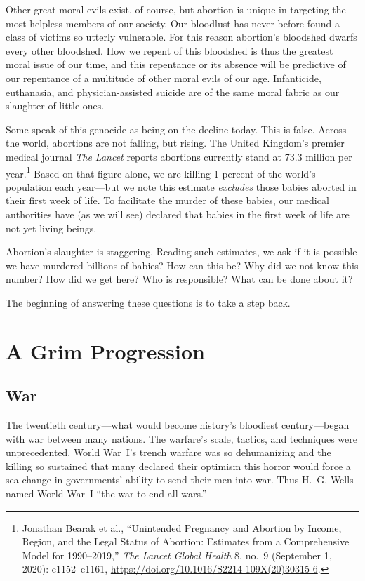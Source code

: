 \documentclass[
]{book}
\begin{document}
Other great moral evils exist, of course, but abortion is unique in targeting the most helpless members of our society. Our bloodlust has never before found a class of victims so utterly vulnerable. For this reason abortion's bloodshed dwarfs every other bloodshed. How we repent of this bloodshed is thus the greatest moral issue of our time, and this repentance or its absence will be predictive of our repentance of a multitude of other moral evils of our age. Infanticide, euthanasia, and physician-assisted suicide are of the same moral fabric as our slaughter of little ones.

Some speak of this genocide as being on the decline today. This is false. Across the world, abortions are not falling, but rising. The United Kingdom's premier medical journal \emph{The Lancet} reports abortions currently stand at 73.3 million per year.\footnote{Jonathan Bearak et al., ``Unintended Pregnancy and Abortion by Income, Region, and the Legal Status of Abortion: Estimates from a Comprehensive Model for 1990--2019,'' \emph{The Lancet Global Health} 8, no.~9 (September 1, 2020): e1152--e1161, \url{https://doi.org/10.1016/S2214-109X(20)30315-6}.} Based on that figure alone, we are killing 1 percent of the world's population each year---but we note this estimate \emph{excludes} those babies aborted in their first week of life. To facilitate the murder of these babies, our medical authorities have (as we will see) declared that babies in the first week of life are not yet living beings.

Abortion's slaughter is staggering. Reading such estimates, we ask if it is possible we have murdered billions of babies? How can this be? Why did we not know this number? How did we get here? Who is responsible? What can be done about it?

The beginning of answering these questions is to take a step back.

\hypertarget{a-grim-progression}{%
\section{A Grim Progression}\label{a-grim-progression}}

\hypertarget{war}{%
\subsection{War}\label{war}}

The twentieth century---what would become history's bloodiest century---began with war between many nations. The warfare's scale, tactics, and techniques were unprecedented. World War~I's trench warfare was so dehumanizing and the killing so sustained that many declared their optimism this horror would force a sea change in governments' ability to send their men into war. Thus H.~G. Wells named World War~I ``the war to end all wars.''
\end{document}
